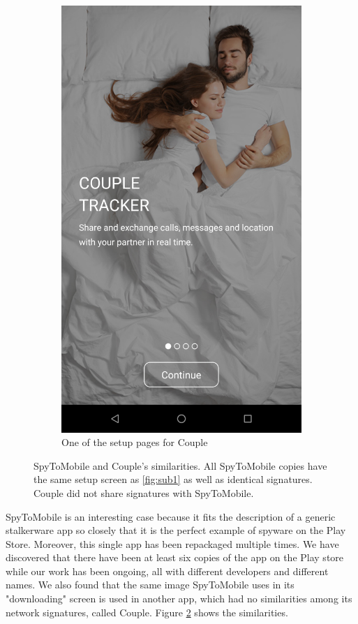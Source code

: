 \documentclass[acmtog]{acmart}
\begin{document}
\begin{figure}
\begin{subfigure}{0.5\columnwidth}
		\includegraphics[width=0.9\linewidth]{../images/CoupleTrackerSetup.png}
		\caption{One of the setup pages for Couple}
		\label{fig:sub2}
	\end{subfigure}
	\caption{SpyToMobile and Couple's similarities. All SpyToMobile copies have 
	the same setup screen as \ref{fig:sub1} as well as identical signatures. 
	Couple did not share signatures with SpyToMobile.}
	\label{fig:spytomobile_couple}
\end{figure}


SpyToMobile is an interesting case 
because it fits the description of a generic stalkerware app so closely that it 
is the perfect example of spyware on the Play Store. Moreover, this single app 
has been repackaged multiple times. We have discovered that there have been at 
least six copies of the app on the Play store while our work has been ongoing, 
all with different developers and 
different names. We also found that the same image SpyToMobile uses in its 
"downloading" screen is used in another app, which had no similarities among 
its network signatures, called Couple. Figure \ref{fig:spytomobile_couple} 
shows the similarities.
\end{document}
